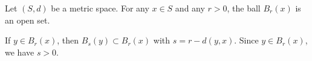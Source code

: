 Let $(S, d)$ be a metric space. For any $x \in S$ and any $r > 0$, the ball $B_r(x)$ is an open set.

If $y \in B_r(x)$, then $B_s(y) \subset B_r(x)$ with $s = r - d(y, x)$. Since $y \in B_r(x)$, we have $s > 0$.
